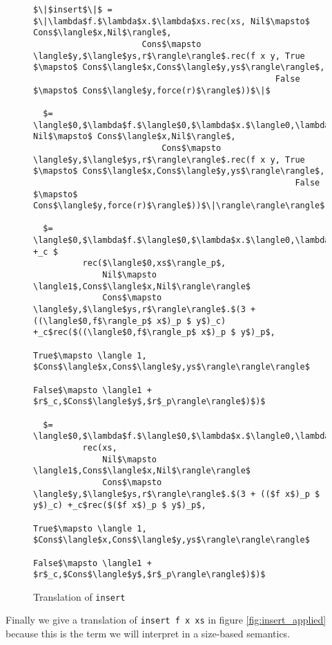 \documentclass[12pt,letterpaper]{article}
\newcommand{\T}[1]{\texttt{#1}}
\begin{document}
\begin{figure}[H]
\caption{Translation of \T{insert}}
\label{fig:insert}
\begin{lstlisting}
$\|$insert$\|$ = $\|\lambda$f.$\lambda$x.$\lambda$xs.rec(xs, Nil$\mapsto$ Cons$\langle$x,Nil$\rangle$,
                      Cons$\mapsto \langle$y,$\langle$ys,r$\rangle\rangle$.rec(f x y, True $\mapsto$ Cons$\langle$x,Cons$\langle$y,ys$\rangle\rangle$,
                                                 False $\mapsto$ Cons$\langle$y,force(r)$\rangle$))$\|$

  $= \langle$0,$\lambda$f.$\langle$0,$\lambda$x.$\langle0,\lambda$xs.$\|$rec(xs, Nil$\mapsto$ Cons$\langle$x,Nil$\rangle$,
                          Cons$\mapsto \langle$y,$\langle$ys,r$\rangle\rangle$.rec(f x y, True $\mapsto$ Cons$\langle$x,Cons$\langle$y,ys$\rangle\rangle$,
                                                     False $\mapsto$ Cons$\langle$y,force(r)$\rangle$))$\|\rangle\rangle\rangle$

  $= \langle$0,$\lambda$f.$\langle$0,$\lambda$x.$\langle0,\lambda$xs.$\langle$0,xs$\rangle_c +_c $
          rec($\langle$0,xs$\rangle_p$,
              Nil$\mapsto \langle1$,Cons$\langle$x,Nil$\rangle\rangle$
              Cons$\mapsto \langle$y,$\langle$ys,r$\rangle\rangle$.$(3 + ((\langle$0,f$\rangle_p$ x$)_p $ y$)_c) +_c$rec($((\langle$0,f$\rangle_p$ x$)_p $ y$)_p$,
                                                   True$\mapsto \langle 1, $Cons$\langle$x,Cons$\langle$y,ys$\rangle\rangle\rangle$
                                                   False$\mapsto \langle1 + $r$_c,$Cons$\langle$y$,$r$_p\rangle\rangle$)$)$

  $= \langle$0,$\lambda$f.$\langle$0,$\lambda$x.$\langle0,\lambda$xs.
          rec(xs,
              Nil$\mapsto \langle1$,Cons$\langle$x,Nil$\rangle\rangle$
              Cons$\mapsto \langle$y,$\langle$ys,r$\rangle\rangle$.$(3 + (($f x$)_p $ y$)_c) +_c$rec($($f x$)_p $ y$)_p$,
                                                 True$\mapsto \langle 1, $Cons$\langle$x,Cons$\langle$y,ys$\rangle\rangle\rangle$
                                                 False$\mapsto \langle1 + $r$_c,$Cons$\langle$y$,$r$_p\rangle\rangle$)$)$
\end{lstlisting}
\end{figure}


Finally we give a translation of \T{insert f x xs} in figure \ref{fig:insert_applied} because this is the term we will interpret in a size-based semantics.
\end{document}
